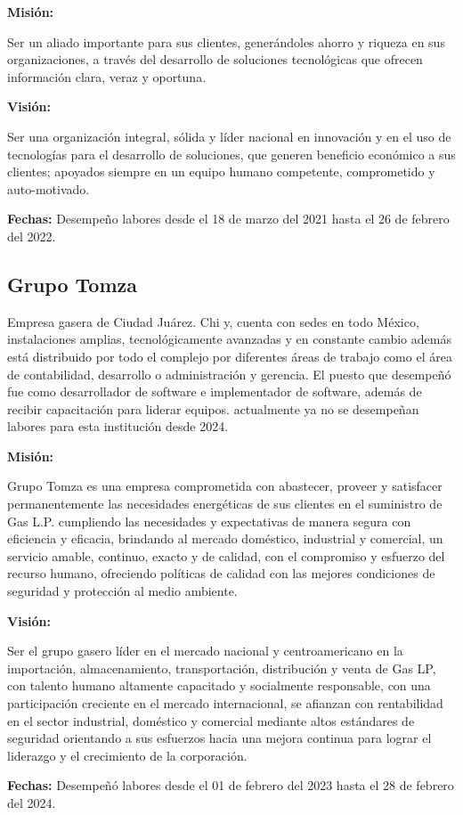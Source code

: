 \documentclass[protocolo.tex]{subfiles}
\begin{document}
\textbf{Misión:}

Ser un aliado importante para sus clientes, generándoles ahorro y riqueza en sus organizaciones, a través del desarrollo de soluciones tecnológicas que ofrecen información clara, veraz y oportuna.\vspace{5mm} 


\textbf{Visión:}

Ser una organización integral, sólida y líder nacional en innovación y en el uso de tecnologías para el desarrollo de soluciones, que generen beneficio económico a sus clientes; apoyados siempre en un equipo humano competente, comprometido y auto-motivado.\vspace{5mm}

\textbf{Fechas:}
Desempeño labores desde el 18 de marzo del 2021 hasta el 26 de febrero del 2022.

\subsection{Grupo Tomza}
Empresa gasera de Ciudad Juárez. Chi y, cuenta con sedes en todo México, instalaciones amplias, tecnológicamente avanzadas y en constante cambio además está distribuido por todo el complejo por diferentes áreas de trabajo como el área de contabilidad, desarrollo o administración y gerencia. El puesto que desempeñó fue como desarrollador de software e implementador de software, además de recibir capacitación para liderar equipos. actualmente ya no se desempeñan labores para esta institución desde 2024.\vspace{5mm} 

\textbf{Misión:}

Grupo Tomza es una empresa comprometida con abastecer, proveer y satisfacer permanentemente las necesidades energéticas de sus clientes en el suministro de Gas L.P. cumpliendo las necesidades y expectativas de manera segura con eficiencia y eficacia, brindando al mercado doméstico, industrial y comercial, un servicio amable, continuo, exacto y de calidad, con el compromiso y esfuerzo del recurso humano, ofreciendo políticas de calidad con las mejores condiciones de seguridad y protección al medio ambiente.\vspace{5mm} 

\textbf{Visión:} 

Ser el grupo gasero líder en el mercado nacional y centroamericano en la importación, almacenamiento, transportación, distribución y venta de Gas LP, con talento humano altamente capacitado y socialmente responsable, con una participación creciente en el mercado internacional, se afianzan con rentabilidad en el sector industrial, doméstico y comercial mediante altos estándares de seguridad orientando a sus esfuerzos hacia una mejora continua para lograr el liderazgo y el crecimiento de la corporación.\vspace{5mm} 

\textbf{Fechas:}
Desempeñó labores desde el 01 de febrero del 2023 hasta el 28 de febrero del 2024.
\end{document}
